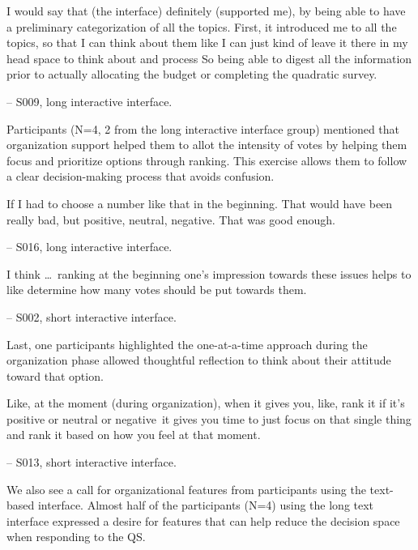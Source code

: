 \begin{displayquote}
I would say that (the interface) definitely (supported me), by being able to have a preliminary categorization of all the topics. First, it introduced me to all the topics, so that I can think about them like I can just kind of leave it there in my head space to think about and process \bracketellipsis So being able to digest all the information prior to actually allocating the budget or completing the quadratic survey.

\noindent \hfill -- S009, long interactive interface.
\end{displayquote}

Participants (N=4, 2 from the long interactive interface group) mentioned that organization support helped them to allot the intensity of votes by helping them focus and prioritize options through ranking. This exercise allows them to follow a clear decision-making process that avoids confusion.

\begin{displayquote}
If I had to choose a number like that in the beginning. That would have been really bad, but positive, neutral, negative. That was good enough.

\noindent \hfill -- S016, long interactive interface.
\end{displayquote}

\begin{displayquote}
I think \ldots\ ranking at the beginning one's impression towards these issues helps to like determine how many votes should be put towards them. 

\noindent \hfill -- S002, short interactive interface.
\end{displayquote}

Last, one participants highlighted the one-at-a-time approach during the organization phase allowed thoughtful reflection to think about their attitude toward that option.

\begin{displayquote}
Like, at the moment (during organization), when it gives you, like, rank it if it's positive or neutral or negative~\bracketellipsis it gives you time to just focus on that single thing and rank it based on how you feel at that moment.
    
    \noindent \hfill -- S013, short interactive interface.
\end{displayquote}

We also see a call for organizational features from participants using the text-based interface. Almost half of the participants (N=4) using the long text interface expressed a desire for features that can help reduce the decision space when responding to the QS.

